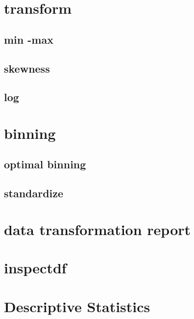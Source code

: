 \documentclass[]{article}
\begin{document}
\hypertarget{transform}{%
\section{transform}\label{transform}}

\hypertarget{min--max}{%
\subsection{min -max}\label{min--max}}

\hypertarget{skewness}{%
\subsection{skewness}\label{skewness}}

\hypertarget{log}{%
\subsection{log}\label{log}}

\hypertarget{binning}{%
\section{binning}\label{binning}}

\hypertarget{optimal-binning}{%
\subsection{optimal binning}\label{optimal-binning}}

\hypertarget{standardize}{%
\subsection{standardize}\label{standardize}}

\hypertarget{data-transformation-report}{%
\section{data transformation report}\label{data-transformation-report}}

\hypertarget{inspectdf}{%
\section{inspectdf}\label{inspectdf}}

\pagebreak

\hypertarget{descriptive-statistics}{%
\section{Descriptive Statistics}\label{descriptive-statistics}}
\end{document}
